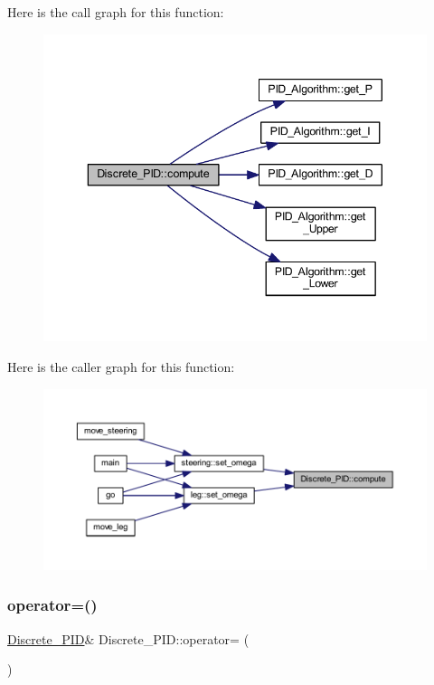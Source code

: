 Here is the call graph for this function\+:
\nopagebreak
\begin{figure}[H]
\begin{center}
\leavevmode
\includegraphics[width=343pt]{class_discrete___p_i_d_aa4914b85e73cb5fdfcc5b40e8d0ff23c_cgraph}
\end{center}
\end{figure}
Here is the caller graph for this function\+:
\nopagebreak
\begin{figure}[H]
\begin{center}
\leavevmode
\includegraphics[width=350pt]{class_discrete___p_i_d_aa4914b85e73cb5fdfcc5b40e8d0ff23c_icgraph}
\end{center}
\end{figure}
\mbox{\label{class_discrete___p_i_d_a8b710e438648c3cc88b643090074254b}} 
\subsubsection{\texorpdfstring{operator=()}{operator=()}\hspace{0.1cm}{\footnotesize\ttfamily [1/2]}}
{\footnotesize\ttfamily \mbox{\hyperlink{class_discrete___p_i_d}{Discrete\+\_\+\+P\+ID}}\& Discrete\+\_\+\+P\+I\+D\+::operator= (\begin{DoxyParamCaption}\item[{\mbox{\hyperlink{class_discrete___p_i_d}{Discrete\+\_\+\+P\+ID}} \&\&}]{ }\end{DoxyParamCaption})\hspace{0.3cm}{\ttfamily [default]}}

